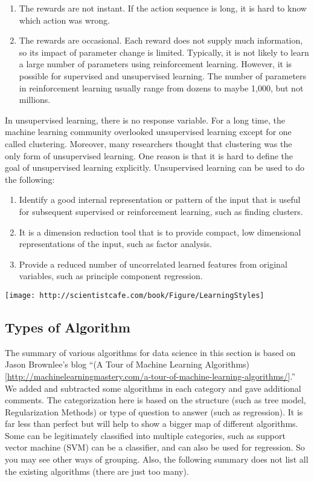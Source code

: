 \documentclass[
]{article}
\begin{document}
\begin{enumerate}
\def\labelenumi{(\arabic{enumi})}
\item
  The rewards are not instant. If the action sequence is long, it is
  hard to know which action was wrong.
\item
  The rewards are occasional. Each reward does not supply much
  information, so its impact of parameter change is limited. Typically,
  it is not likely to learn a large number of parameters using
  reinforcement learning. However, it is possible for supervised and
  unsupervised learning. The number of parameters in reinforcement
  learning usually range from dozens to maybe 1,000, but not millions.
\end{enumerate}

In unsupervised learning, there is no response variable. For a long
time, the machine learning community overlooked unsupervised learning
except for one called clustering. Moreover, many researchers thought
that clustering was the only form of unsupervised learning. One reason
is that it is hard to define the goal of unsupervised learning
explicitly. Unsupervised learning can be used to do the following:

\begin{enumerate}
\def\labelenumi{(\arabic{enumi})}
\item
  Identify a good internal representation or pattern of the input that
  is useful for subsequent supervised or reinforcement learning, such as
  finding clusters.
\item
  It is a dimension reduction tool that is to provide compact, low
  dimensional representations of the input, such as factor analysis.
\item
  Provide a reduced number of uncorrelated learned features from
  original variables, such as principle component regression.
\end{enumerate}

\texttt{[image: http://scientistcafe.com/book/Figure/LearningStyles]}

\hypertarget{types-of-algorithm}{%
\subsection{Types of Algorithm}\label{types-of-algorithm}}

The summary of various algorithms for data science in this section is
based on Jason Brownlee's blog ``(A Tour of Machine Learning
Algorithms){[}\url{http://machinelearningmastery.com/a-tour-of-machine-learning-algorithms/}{]}.''
We added and subtracted some algorithms in each category and gave
additional comments. The categorization here is based on the structure
(such as tree model, Regularization Methods) or type of question to
answer (such as regression). It is far less than perfect but will help
to show a bigger map of different algorithms. Some can be legitimately
classified into multiple categories, such as support vector machine
(SVM) can be a classifier, and can also be used for regression. So you
may see other ways of grouping. Also, the following summary does not
list all the existing algorithms (there are just too many).
\end{document}
